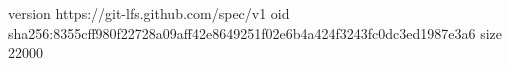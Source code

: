 version https://git-lfs.github.com/spec/v1
oid sha256:8355cff980f22728a09aff42e8649251f02e6b4a424f3243fc0dc3ed1987e3a6
size 22000
